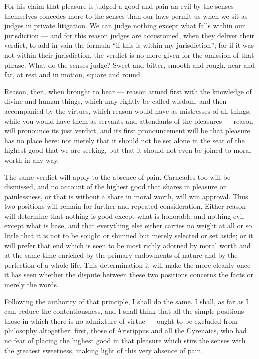  For his claim that pleasure is judged a good and pain an evil by the senses themselves concedes more to the senses than our laws permit us when we sit as judges in private litigation. We can judge nothing except what falls within our jurisdiction — and for this reason judges are accustomed, when they deliver their verdict, to add in vain the formula ``if this is within my jurisdiction''; for if it was not within their jurisdiction, the verdict is no more given for the omission of that phrase. What do the senses judge? Sweet and bitter, smooth and rough, near and far, at rest and in motion, square and round.

 Reason, then, when brought to bear — reason armed first with the knowledge of divine and human things, which may rightly be called wisdom, and then accompanied by the virtues, which reason would have as mistresses of all things, while you would have them as servants and attendants of the pleasures — reason will pronounce its just verdict, and its first pronouncement will be that pleasure has no place here: not merely that it should not be set alone in the seat of the highest good that we are seeking, but that it should not even be joined to moral worth in any way.

 The same verdict will apply to the absence of pain. Carneades too will be dismissed, and no account of the highest good that shares in pleasure or painlessness, or that is without a share in moral worth, will win approval. Thus two positions will remain for further and repeated consideration. Either reason will determine that nothing is good except what is honorable and nothing evil except what is base, and that everything else either carries no weight at all or so little that it is not to be sought or shunned but merely selected or set aside; or it will prefer that end which is seen to be most richly adorned by moral worth and at the same time enriched by the primary endowments of nature and by the perfection of a whole life. This determination it will make the more cleanly once it has seen whether the dispute between these two positions concerns the facts or merely the words.

 Following the authority of that principle, I shall do the same. I shall, as far as I can, reduce the contentiousness, and I shall think that all the simple positions — those in which there is no admixture of virtue — ought to be excluded from philosophy altogether: first, those of Aristippus and all the Cyrenaics, who had no fear of placing the highest good in that pleasure which stirs the senses with the greatest sweetness, making light of this very absence of pain.


